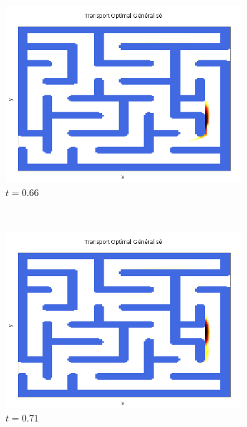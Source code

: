 \documentclass[a4paper,12pt]{article}
\begin{document}
\begin{figure}[!h]
\begin{subfigure}[b]{0.23\linewidth}
\includegraphics[width=\linewidth]{img/2DLabyrinthe/T_00067.png}
\caption*{$t=0.66$}
\end{subfigure}
~
\begin{subfigure}[b]{0.23\linewidth}
\includegraphics[width=\linewidth]{img/2DLabyrinthe/T_00072.png}
\caption*{$t=0.71$}
\end{subfigure}
~
\begin{subfigure}[b]{0.23\linewidth}

\end{subfigure}
\end{figure}
\end{document}
